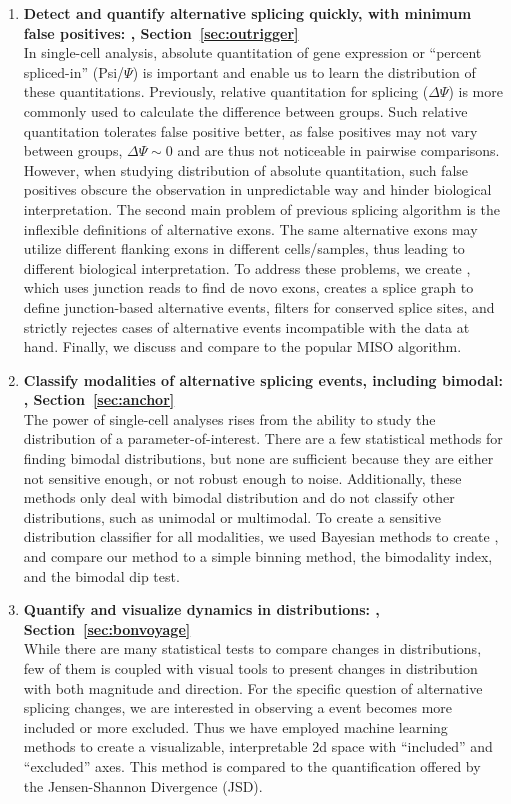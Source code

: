 \begin{enumerate}
	\item \textbf{Detect and quantify alternative splicing quickly, with minimum false positives: \outrigger, Section~\ref{sec:outrigger}}\\
	In single-cell analysis, absolute quantitation of gene expression or ``percent spliced-in'' (Psi/$\Psi$) is important and enable us to learn the distribution of these quantitations. Previously, relative quantitation for splicing ($\Delta\Psi$) is more commonly used to calculate the difference between groups. Such relative quantitation tolerates false positive better, as false positives may not vary between groups, $\Delta\Psi \sim 0$ and are thus not noticeable in pairwise comparisons. However, when studying distribution of absolute quantitation, such false positives obscure the observation in unpredictable way and hinder biological interpretation. The second main problem of previous splicing algorithm is the inflexible definitions of alternative exons. The same alternative exons may utilize different flanking exons in different cells/samples, thus leading to different biological interpretation. To address these problems, we create \outrigger, which uses junction reads to find de novo exons, creates a splice graph to define junction-based alternative events, filters for conserved splice sites, and strictly rejectes cases of alternative events incompatible with the data at hand. Finally, we discuss and compare to the popular MISO\cite{Katz:2010iv} algorithm.
	\item \textbf{Classify modalities of alternative splicing events, including bimodal: \anchor, Section~\ref{sec:anchor}}\\
	The power of single-cell analyses rises from the ability to study the distribution of a parameter-of-interest. There are a few statistical methods for finding bimodal distributions, but none are sufficient because they are either not sensitive enough, or not robust enough to noise. Additionally, these methods only deal with bimodal distribution and do not classify other distributions, such as unimodal or multimodal. To create a sensitive distribution classifier for all modalities, we used Bayesian methods to create \anchor, and compare our method to a simple binning method, the bimodality index\cite{Wang:2009wm}, and the bimodal dip test\cite{Hartigan:1985ca}.
	\item \textbf{Quantify and visualize dynamics in distributions: \bonvoyage, Section~\ref{sec:bonvoyage}}\\
	While there are many statistical tests to compare changes in distributions, few of them is coupled with visual tools to present changes in distribution with both magnitude and direction. For the specific question of alternative splicing changes, we are interested in observing a event becomes more included or more excluded. Thus we have employed machine learning methods to create a visualizable, interpretable 2d space with ``included'' and ``excluded'' axes. This method is compared to the quantification offered by the Jensen-Shannon Divergence (JSD)\cite{Anonymous:2011vn}.
\end{enumerate}

